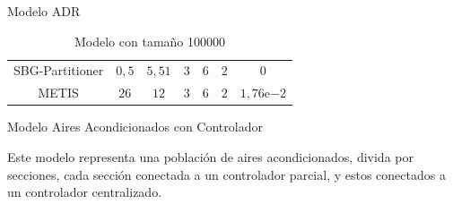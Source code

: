 \begin{frame}{Modelo ADR}
\begin{table}[H]
{\begin{tabular}{*{7}{c}}
        \midrule
        SBG-Partitioner & $0,5$ & $5,51$ & $3$ & $6$ & $2$ & $0$ \\
        METIS & $26$ & $12$ & $3$ & $6$ & $2$ & $1,76\mathrm{e}{-2}$ \\
        \bottomrule
        \end{tabular}}
        \caption{Modelo con tamaño 100000}
    \end{table}

\end{frame}



\begin{frame}{Modelo Aires Acondicionados con Controlador}

    Este modelo representa una población de aires acondicionados, divida por secciones,
    cada sección conectada a un controlador parcial, y estos conectados a un controlador
    centralizado.

    \begin{table}[H]
        \centering
        \caption{Modelo con tamaño 100000}
    \end{table}

    \begin{table}[H]
        \centering
\end{table}
\end{frame}
